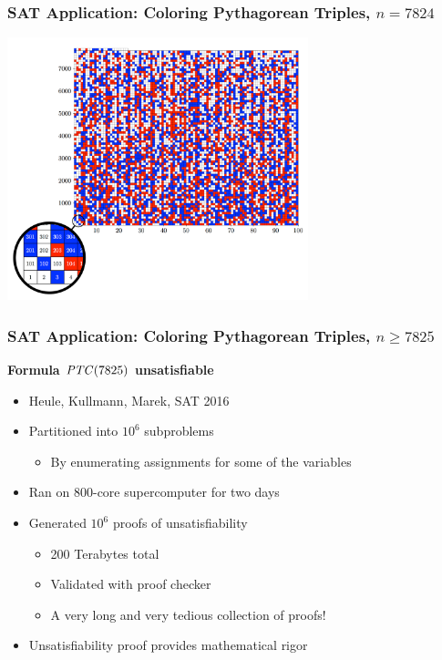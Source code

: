 \documentclass[t,pdf]{beamer}
\begin{document}
\begin{frame}
\frametitle{SAT Application: Coloring Pythagorean Triples, $n=7824$}

\begin{center}
  \includegraphics[height=3in]{figs/triple7824}
\end{center}

\end{frame}

\begin{frame}
\frametitle{SAT Application: Coloring Pythagorean Triples, $n\geq 7825$}

{\bf Formula ${\it PTC}(7825)$ unsatisfiable}
\begin{itemize}
\item Heule, Kullmann, Marek, SAT 2016

\medskip

\item Partitioned into $10^6$ subproblems
  \begin{itemize}
    \item By enumerating assignments for some of the variables
  \end{itemize}

\medskip

  
\item Ran on 800-core supercomputer for two days

\medskip

\item Generated $10^6$ proofs of unsatisfiability
  \begin{itemize}
  \item 200 Terabytes total
  \item Validated with proof checker
  \item A very long and very tedious collection of proofs!
  \end{itemize}

\item Unsatisfiability proof provides mathematical rigor
\end{itemize}

\end{frame}
\end{document}
